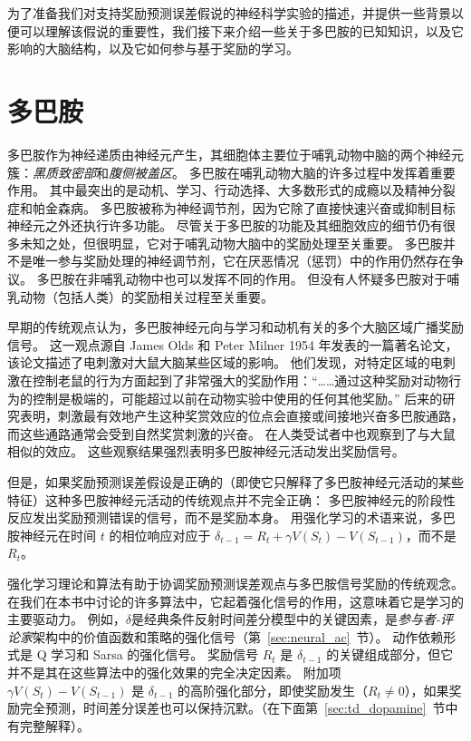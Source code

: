 为了准备我们对支持奖励预测误差假说的神经科学实验的描述，并提供一些背景以便可以理解该假说的重要性，我们接下来介绍一些关于多巴胺的已知知识，以及它影响的大脑结构，以及它如何参与基于奖励的学习。


\section{多巴胺} \label{sec:dopamine}

多巴胺作为神经递质由神经元产生，其细胞体主要位于哺乳动物中脑的两个神经元簇：\textit{黑质致密部}和\textit{腹侧被盖区}。
多巴胺在哺乳动物大脑的许多过程中发挥着重要作用。
其中最突出的是动机、学习、行动选择、大多数形式的成瘾以及精神分裂症和帕金森病。
多巴胺被称为神经调节剂，因为它除了直接快速兴奋或抑制目标神经元之外还执行许多功能。
尽管关于多巴胺的功能及其细胞效应的细节仍有很多未知之处，但很明显，它对于哺乳动物大脑中的奖励处理至关重要。
多巴胺并不是唯一参与奖励处理的神经调节剂，它在厌恶情况（惩罚）中的作用仍然存在争议。
多巴胺在非哺乳动物中也可以发挥不同的作用。
但没有人怀疑多巴胺对于哺乳动物（包括人类）的奖励相关过程至关重要。


早期的传统观点认为，多巴胺神经元向与学习和动机有关的多个大脑区域广播奖励信号。
这一观点源自 James Olds 和 Peter Milner 1954 年发表的一篇著名论文，该论文描述了电刺激对大鼠大脑某些区域的影响。
他们发现，对特定区域的电刺激在控制老鼠的行为方面起到了非常强大的奖励作用：“……通过这种奖励对动物行为的控制是极端的，可能超过以前在动物实验中使用的任何其他奖励。”\cite{olds1954positive}
后来的研究表明，刺激最有效地产生这种奖赏效应的位点会直接或间接地兴奋多巴胺通路，而这些通路通常会受到自然奖赏刺激的兴奋。
在人类受试者中也观察到了与大鼠相似的效应。
这些观察结果强烈表明多巴胺神经元活动发出奖励信号。


但是，如果奖励预测误差假设是正确的（即使它只解释了多巴胺神经元活动的某些特征）这种多巴胺神经元活动的传统观点并不完全正确：
多巴胺神经元的阶段性反应发出奖励预测错误的信号，而不是奖励本身。
用强化学习的术语来说，多巴胺神经元在时间 $ t $ 的相位响应对应于 $ \delta_{t-1} = R_t + \gamma V(S_t) - V(S_{t-1}) $，而不是 $ R_t $。


强化学习理论和算法有助于协调奖励预测误差观点与多巴胺信号奖励的传统观念。
在我们在本书中讨论的许多算法中，它起着强化信号的作用，这意味着它是学习的主要驱动力。
例如，$ \delta $是经典条件反射时间差分模型中的关键因素，是\textit{参与者-评论家}架构中的价值函数和策略的强化信号（第~\ref{sec:neural_ac}~节）。
动作依赖形式是 Q 学习和 Sarsa 的强化信号。
奖励信号 $ R_t $ 是 $ \delta_{t-1} $ 的关键组成部分，但它并不是其在这些算法中的强化效果的完全决定因素。
附加项 $ \gamma V(S_t) - V(S_{t-1}) $ 是 $ \delta_{t-1} $ 的高阶强化部分，即使奖励发生（$ R_t \neq 0 $），如果奖励完全预测，时间差分误差也可以保持沉默。（在下面第~\ref{sec:td_dopamine}~节中有完整解释）。


